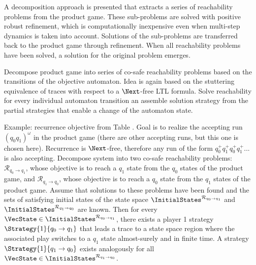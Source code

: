 A decomposition approach is presented that extracts a series of reachability problems from the product game.
These sub-problems are solved with positive robust refinement, which is computationally inexpensive even when multi-step dynamics is taken into account.
Solutions of the sub-problems are transferred back to the product game through refinement.
When all reachability problems have been solved, a solution for the original problem emerges.


\startsubsection[title={Transition-based Reachability Decomposition},reference=sec:refinement-transition-decomposition]

    Decompose product game into series of co-safe reachability problems based on the transitions of the objective automaton.
    Idea is again based on the stuttering equivalence of traces with respect to a $\Next$-free LTL formula.
    Solve reachability for every individual automaton transition an assemble solution strategy from the partial strategies that enable a change of the automaton state.

    Example: recurrence objective from Table .
    Goal is to realize the accepting run $(q_0 q_1)^\omega$ in the product game (there are other accepting runs, but this one is chosen here).
    Recurrence is $\Next$-free, therefore any run of the form $q_0^+ q_1^+ q_0^+ q_1^+ ...$ is also accepting.
    Decompose system into two co-safe reachability problems:
    $\mathcal{R}_{q_0 \rightarrow q_1}$, whose objective is to reach a $q_1$ state from the $q_0$ states of the product game, and $\mathcal{R}_{q_1 \rightarrow q_0}$, whose objective is to reach a $q_0$ state from the $q_1$ states of the product game.
    Assume that solutions to these problems have been found and the sets of satisfying initial states of the state space $\InitialStates^{\mathcal{R}_{q_0 \rightarrow q_1}}$ and $\InitialStates^{\mathcal{R}_{q_1 \rightarrow q_0}}$ are known.
    Then for every $\VecState \in \InitialStates^{\mathcal{R}_{q_0 \rightarrow q_1}}$, there exists a player 1 strategy $\Strategy{1}{q_0 \rightarrow q_1}$ that leads a trace to a state space region where the associated play switches to a $q_1$ state almost-surely and in finite time.
    A strategy $\Strategy{1}{q_1 \rightarrow q_0}$ exists analogously for all $\VecState \in \InitialStates^{\mathcal{R}_{q_1 \rightarrow q_0}}$.


